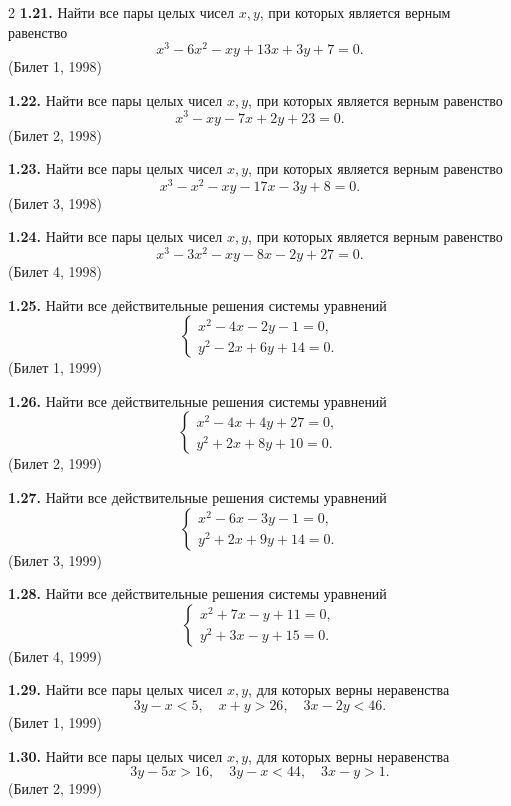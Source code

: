 \documentclass[14pt,a4paper,landscape]{extarticle}
\begin{document}
\begin{multicols}{2}
\textbf{1.21.} Найти все пары целых чисел \(x, y\), при которых является верным равенство
\[
x^3 - 6x^2 - xy + 13x + 3y + 7 = 0.
\]
\hfill \textnormal{(Билет 1, 1998)}

\textbf{1.22.} Найти все пары целых чисел \(x, y\), при которых является верным равенство
\[
x^3 - xy - 7x + 2y + 23 = 0.
\]
\hfill \textnormal{(Билет 2, 1998)}

\textbf{1.23.} Найти все пары целых чисел \(x, y\), при которых является верным равенство
\[
x^3 - x^2 - xy - 17x - 3y + 8 = 0.
\]
\hfill \textnormal{(Билет 3, 1998)}

\textbf{1.24.} Найти все пары целых чисел \(x, y\), при которых является верным равенство
\[
x^3 - 3x^2 - xy - 8x - 2y + 27 = 0.
\]
\hfill \textnormal{(Билет 4, 1998)}

\textbf{1.25.} Найти все действительные решения системы уравнений
\[
\begin{cases}
x^2 - 4x - 2y - 1 = 0, \\
y^2 - 2x + 6y + 14 = 0.
\end{cases}
\]
\hfill \textnormal{(Билет 1, 1999)}

\textbf{1.26.} Найти все действительные решения системы уравнений
\[
\begin{cases}
x^2 - 4x + 4y + 27 = 0, \\
y^2 + 2x + 8y + 10 = 0.
\end{cases}
\]
\hfill \textnormal{(Билет 2, 1999)}

\textbf{1.27.} Найти все действительные решения системы уравнений
\[
\begin{cases}
x^2 - 6x - 3y - 1 = 0, \\
y^2 + 2x + 9y + 14 = 0.
\end{cases}
\]
\hfill \textnormal{(Билет 3, 1999)}

\textbf{1.28.} Найти все действительные решения системы уравнений
\[
\begin{cases}
x^2 + 7x - y + 11 = 0, \\
y^2 + 3x - y + 15 = 0.
\end{cases}
\]
\hfill \textnormal{(Билет 4, 1999)}

\textbf{1.29.} Найти все пары целых чисел \(x, y\), для которых верны неравенства
\[
3y - x < 5, \quad x + y > 26, \quad 3x - 2y < 46.
\]
\hfill \textnormal{(Билет 1, 1999)}

\textbf{1.30.} Найти все пары целых чисел \(x, y\), для которых верны неравенства
\[
3y - 5x > 16, \quad 3y - x < 44, \quad 3x - y > 1.
\]
\hfill \textnormal{(Билет 2, 1999)}


\end{multicols}
\end{document}
